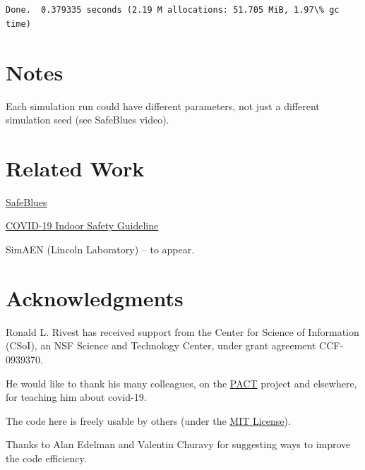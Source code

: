 \documentclass[11pt]{article}
\begin{document}
    \begin{center}
    \end{center}
    { \hspace*{\fill} \\}
    
    \begin{Verbatim}[commandchars=\\\{\}]

Done.  0.379335 seconds (2.19 M allocations: 51.705 MiB, 1.97\% gc time)
    \end{Verbatim}
\newpage
    \hypertarget{notes}{%
\section{Notes}\label{notes}}

Each simulation run could have different parameters, not just a
different simulation seed (see SafeBlues video).

    \hypertarget{related-work}{%
\section{Related Work}\label{related-work}}

\href{https://safeblues.org/}{SafeBlues}

\href{http://www.mit.edu/~bazant/COVID-19/}{COVID-19 Indoor Safety
Guideline}

SimAEN (Lincoln Laboratory) -- to appear.

    \hypertarget{acknowledgments}{%
\section{Acknowledgments}\label{acknowledgments}}

Ronald L. Rivest has received support from the Center for Science of
Information (CSoI), an NSF Science and Technology Center, under grant
agreement CCF-0939370.

He would like to thank his many colleagues, on the
\href{http://pact.mit.edu}{PACT} project and elsewhere, for teaching him
about covid-19.

The code here is freely usable by others (under the
\href{https://opensource.org/licenses/MIT}{MIT License}).

Thanks to Alan Edelman and Valentin Churavy for suggesting ways to
improve the code efficiency.


    
    
    
\end{document}
